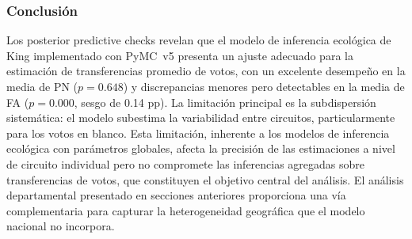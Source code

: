 \subsubsection{Conclusi\'on}

Los posterior predictive checks revelan que el modelo de inferencia ecol\'ogica de King implementado con PyMC~v5 presenta un ajuste adecuado para la estimaci\'on de transferencias promedio de votos, con un excelente desempe\~no en la media de PN ($p = 0.648$) y discrepancias menores pero detectables en la media de FA ($p = 0.000$, sesgo de 0.14 pp). La limitaci\'on principal es la subdispersi\'on sistem\'atica: el modelo subestima la variabilidad entre circuitos, particularmente para los votos en blanco. Esta limitaci\'on, inherente a los modelos de inferencia ecol\'ogica con par\'ametros globales, afecta la precisi\'on de las estimaciones a nivel de circuito individual pero no compromete las inferencias agregadas sobre transferencias de votos, que constituyen el objetivo central del an\'alisis. El an\'alisis departamental presentado en secciones anteriores proporciona una v\'ia complementaria para capturar la heterogeneidad geogr\'afica que el modelo nacional no incorpora.
